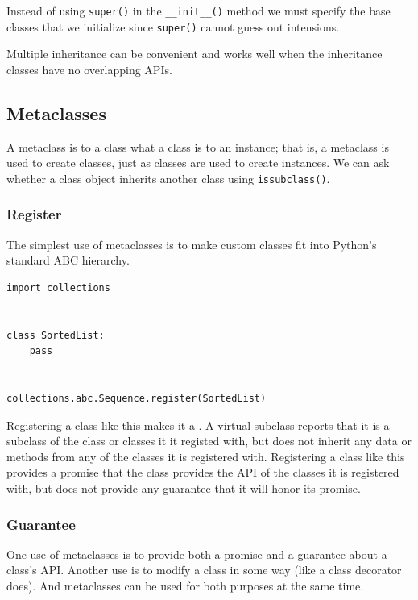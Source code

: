 Instead of using \verb|super()| in the \verb|__init__()| method we must specify the base classes that we initialize since \verb|super()| cannot guess out intensions.


\begin{tcolorbox}
  Multiple inheritance can be convenient and works well when the inheritance classes have no overlapping APIs.
\end{tcolorbox}



\subsection{Metaclasses}

A metaclass is to a class what a class is to an instance; that is, a metaclass is used to create classes, just as classes are used to create instances.
We can ask whether a class object inherits another class using \verb|issubclass()|.


\subsubsection{Register}


The simplest use of metaclasses is to make custom classes fit into Python's standard ABC hierarchy.

\begin{lstlisting}
import collections


class SortedList:
    pass


collections.abc.Sequence.register(SortedList)
\end{lstlisting}


Registering a class like this makes it a .
A virtual subclass reports that it is a subclass of the class or classes it it registed with, but does not inherit any data or methods from any of the classes it is registered with.
Registering a class like this provides a promise that the class provides the API of the classes it is registered with, but does not provide any guarantee that it will honor its promise.


\subsubsection{Guarantee}


One use of metaclasses is to provide both a promise and a guarantee about a class's API.
Another use is to modify a class in some way (like a class decorator does).
And metaclasses can be used for both purposes at the same time.



